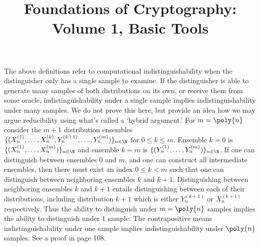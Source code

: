The above definitions refer to computational indistinguishability when the distinguisher only has a single sample to examine.
If the distinguisher is able to generate many samples of both distributions on its own, or receive them from some oracle, indistinguishability under a single sample implies indistinguishability under many samples.
We do not prove this here, but provide an idea how we may argue reducibility using what's called a `hybrid argument.'
For $m=\poly{n}$ consider the $m+1$ distribution ensembles $\{(X_n^{(1)},\dots,X_n^{(k)}, Y_n^{(k+1)},\dots,Y_n^{(m)})\}_{n\in\N}$ for $0\leq k\leq m$.
Ensemble $k=0$ is $\{(X_n^{(1)},\dots,X_n^{(m)})\}_{n\in\N}$ and ensemble $k=m$ is $\{(Y_n^{(1)},\dots,Y_n^{(m)})\}_{n\in\N}$.
If one can distinguish between ensembles $0$ and $m$, and one can construct all intermediate ensembles, then there must exist an index $0\leq k<m$ such that one can distinguish between neighboring ensembles $k$ and $k+1$.
Distinguishing between neighboring ensembles $k$ and $k+1$ entails distinguishing between each of their distributions, including distribution $k+1$ which is either $Y_n^{(k+1)}$ or $X_n^{(k+1)}$ respectively.
Thus the ability to distinguish under $m=\poly{n}$ samples implies the ability to distinguish under $1$ sample.
The contrapositive means indistinguishability under one sample implies indistinguishability under $\poly{n}$ samples.
See a proof in \cite{Gol01} page 108.



\begin{references}
    \title{Foundations of Cryptography: Volume 1, Basic Tools}
\end{references}
